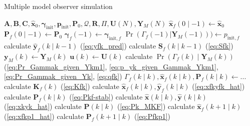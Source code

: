 \begin{algorithm}
	\caption{Multiple model observer simulation}  \label{alg:afmm}
	\begin{algorithmic}
			\Require $\mathbf{A}, \mathbf{B}, \mathbf{C}, \mathbf{\hat{x}}_0, \mathbf{\gamma}_{\text{init}}, \mathbf{p}_{\text{init}}, \mathbf{P}_0, \mathcal{Q}, \mathbf{R}, \Pi, \mathbf{U}(N), \mathbf{Y}_M(N)$
				\State $\mathbf{\hat{x}}_f(0 \mid -1) \gets \mathbf{\hat{x}}_0$
				\State $\mathbf{P}_f(0 \mid -1) \gets \mathbf{P}_0$
				\State $\mathbf{\gamma}_f(-1) \gets \mathbf{\gamma}_{\text{init},f}$
				\State $\Pr(\Gamma_f(-1)|\mathbf{Y}_M(-1))) \gets p_{\text{init},f}$
			\EndFor
				\State calculate $\mathbf{\hat{y}}_f(k \mid k-1)$ (\ref{eq:yfk_pred}) 
				\State calculate $\mathbf{S}_f(k \mid k-1)$ (\ref{eq:Sfk})
			\EndFor
			\State $\mathbf{y}_M(k) \gets \mathbf{Y}_M(k)$   %
			\State $\mathbf{u}(k) \gets \mathbf{U}(k)$
				\State calculate $\Pr(\Gamma_f(k) \mid \mathbf{Y}_M(k))$ (\ref{eq:Pr_Gammak_given_Ykm1}, \ref{eq:p_yk_given_Gammak_Ykm1}, \ref{eq:Pr_Gammak_given_Yk}, \ref{eq:qfk})       %
			\EndFor
			\State $\Gamma_f(k \mid k), \mathbf{\hat{x}}_f(k \mid k), \mathbf{P}_f(k \mid k) \gets ...$   %
				\State calculate $\mathbf{K}_f(k)$ (\ref{eq:Kfk}) 
				\State calculate $\mathbf{\hat{x}}_f(k \mid k), \mathbf{\hat{y}}_f(k \mid k)$ (\ref{eq:xfkyfk_hat})
				\State calculate $\mathbf{P}_f(k \mid k)$ (\ref{eq:Pkf-stab})
			\EndFor
			\State calculate $\mathbf{\hat{x}}(k \mid k), \mathbf{\hat{y}}(k \mid k)$ (\ref{eq:xkyk_hat}) 
			\State calculate $\mathbf{P}(k \mid k)$ (\ref{eq:Pk_MKF})   %
				\State calculate $\mathbf{\hat{x}}_f(k+1 \mid k)$ (\ref{eq:xfkp1_hat}) 
				\State calculate $\mathbf{P}_f(k+1 \mid k)$ (\ref{eq:Pfkp1})
			\EndFor
			\EndFor
		\end{algorithmic}
\end{algorithm}

